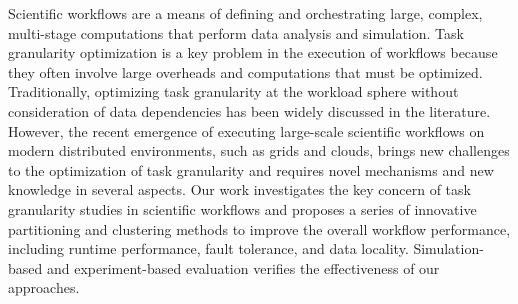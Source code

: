 Scientific workflows are a means of defining and orchestrating large, complex, multi-stage computations that perform data analysis and simulation. 
Task granularity optimization is a key problem in the execution of workflows because they often involve large overheads and computations that must be optimized. 
Traditionally, optimizing task granularity at the workload sphere without consideration of data dependencies has been widely discussed in the literature. 
However, the recent emergence of executing large-scale scientific workflows on modern distributed environments, such as grids and clouds, brings new challenges to the optimization of task granularity and requires novel mechanisms and new knowledge in several aspects. Our work investigates the key concern of task granularity studies in scientific workflows and proposes a series of innovative partitioning and clustering methods to improve the overall workflow performance, including runtime performance, fault tolerance, and data locality. Simulation-based and experiment-based evaluation verifies the effectiveness of our approaches. 


